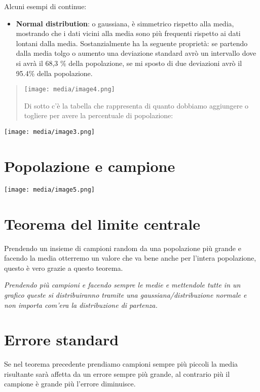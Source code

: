 Alcuni esempi di continue:

\begin{itemize}
\item
  \textbf{Normal distribution}: o gaussiana, è simmetrico rispetto alla
  media, mostrando che i dati vicini alla media sono più frequenti
  rispetto ai dati lontani dalla media. Sostanzialmente ha la seguente
  proprietà: se partendo dalla media tolgo o aumento una deviazione
  standard avrò un intervallo dove si avrà il 68,3 \% della popolazione,
  se mi sposto di due deviazioni avrò il 95.4\% della popolazione.
\end{itemize}

\begin{quote}
\texttt{[image: media/image4.png]}

Di sotto c'è la tabella che rappresenta di quanto dobbiamo aggiungere o
togliere per avere la percentuale di popolazione:
\end{quote}

\texttt{[image: media/image3.png]}

\section{Popolazione e campione}\label{popolazione-e-campione}

\texttt{[image: media/image5.png]}

\section{Teorema del limite centrale}\label{teorema-del-limite-centrale}

Prendendo un insieme di campioni random da una popolazione più grande e
facendo la media otterremo un valore che va bene anche per l'intera
popolazione, questo è vero grazie a questo teorema.

\emph{Prendendo più campioni e facendo sempre le medie e mettendole
tutte in un grafico queste si distribuiranno tramite una
gaussiana/distribuzione normale e non importa com'era la distribuzione
di partenza.}

\section{Errore standard}\label{errore-standard}

Se nel teorema precedente prendiamo campioni sempre più piccoli la media
risultante sarà affetta da un errore sempre più grande, al contrario più
il campione è grande più l'errore diminuisce.


